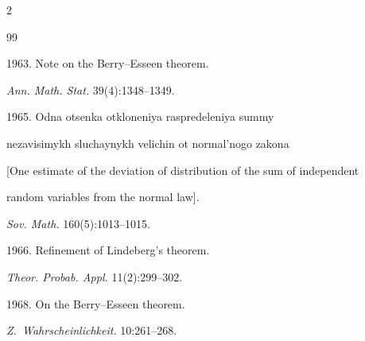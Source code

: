 




  \begin{multicols}{2}





\renewcommand{\bibname}{\protect\rmfamily References}







{\small\frenchspacing


 {%




 \begin{thebibliography}{99}







 1963. Note on the Berry--Esseen theorem. 


\textit{Ann. Math. Stat.} 39(4):1348--1349.







 1965. Odna otsenka otkloneniya raspredeleniya summy


nezavisimykh sluchaynykh velichin ot normal'nogo zakona


[One estimate of the deviation of distribution of the sum of independent


random variables from the normal law]. 


\textit{Sov. Math.} 160(5):1013--1015.







 1966. Refinement of Lindeberg's theorem. 


\textit{Theor. Probab. Appl.} 11(2):299--302.







 1968. On the Berry--Esseen theorem. 


\textit{Z.~Wahrscheinlichkeit.} 10:261--268.






\end{thebibliography}}}
\end{multicols}
